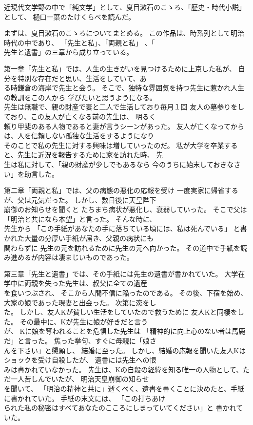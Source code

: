 \documentclass[a4paper,landscape]{tarticle}
\begin{document}
近現代文学野の中で「純文学」として、夏目漱石のこゝろ、「歴史・時代小説」として、
樋口一葉のたけくらべを読んだ。 \par
まずは、夏目漱石のこゝろについてまとめる。
この作品は、時系列として明治時代の中であり、
「先生と私」、「両親と私」
、「 \\ 先生と遺書」の三章から成り立っている。

第一章「先生と私」では、人生の生きがいを見つけるために上京した私が、
自分を特別な存在だと思い、生活をしていて、あ \\ る時鎌倉の海岸で先生と会う。
そこで、独特な雰囲気を持つ先生に惹かれ人生の教訓をこの人から
学びたいと思うようになる。 \\ 
先生は無職で、親の財産で妻と二人で生活しており毎月１回
友人の墓参りをしており、この友人が亡くなる前の先生は、
明るく \\ 頼り甲斐のある人物であると妻が言うシーンがあった。
友人が亡くなってからは、人を信頼しない孤独な生活をするようになり \\ 
そのことで私の先生に対する興味は増していったのだ。
私が大学を卒業すると、先生に近況を報告するために家を訪れた時、
先 \\ 生は私に対して、「親の財産が少しでもあるなら
今のうちに始末しておきなさい」を助言した。

第二章「両親と私」では、父の病態の悪化の応報を受け
一度実家に帰省するが、父は元気だった。
しかし、数日後に天皇陛下 \\ 崩御のお知らせを聞くと
たちまち病状が悪化し、衰弱していった。
そこで父は「明治と共になら本望」と言った。
そんな時に、 \\ 先生から
「この手紙があなたの手に落ちている頃には、私は死んでいる」
と書かれた大量の分厚い手紙が届き、父親の病状にも \\ 関わらずに
先生の元を訪れるために先生の元へ向かった。
その道中で手紙を読み進めるが内容は凄まじいものであった。

第三章「先生と遺書」では、その手紙には先生の遺書が書かれていた。
大学在学中に両親を失った先生は、叔父に全ての遺産 \\ を食いつぶされ、
そこから人間不信に陥ったのである。
その後、下宿を始め、大家の娘であった現妻と出会った。
次第に恋をし \\ た。
しかし、友人Kが貧しい生活をしていたので救うために
友人Kと同棲をした。
その最中に、Kが先生に娘が好きだと言う \\ が、
Kに娘を奪われることを危惧した先生は
「精神的に向上心のない者は馬鹿だ」と言った。
焦った挙句、すぐに母親に「娘さ \\ んを下さい」と懇願し、
結婚に至った。
しかし、結婚の応報を聞いた友人Kはショックを受け自殺したが、
遺書には先生への恨 \\ みは書かれていなかった。
先生は、Kの自殺の経緯を知る唯一の人物として、ただ一人苦しんでいたが、
明治天皇崩御の知らせ \\ を聞いて、
「明治の精神と共に」逝くべく、遺書を書くことに決めたと、手紙に書かれていた。
手紙の末文には、
「この打ちあけ \\ られた私の秘密はすべてあなたのこころにしまっていてください」と
書かれていた。
\end{document}
